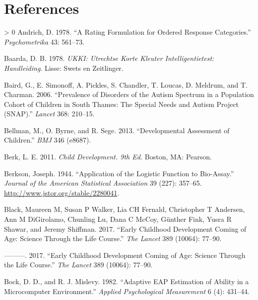 \documentclass[
]{book}
\newlength{\cslhangindent}
\newenvironment{CSLReferences}[3] %
 {%
  \setlength{\parindent}{0pt}
  \ifodd #1 \everypar{\setlength{\hangindent}{\cslhangindent}}\ignorespaces\fi
  \ifnum #2 > 0
  \setlength{\parskip}{#2\baselineskip}
  \fi
 }%
 {}
\begin{document}
\hypertarget{references}{%
\chapter*{References}\label{references}}

\hypertarget{refs}{}
\begin{CSLReferences}{1}{0}
\leavevmode\hypertarget{ref-andrich1978}{}%
Andrich, D. 1978. {``A Rating Formulation for Ordered Response Categories.''} \emph{Psychometrika} 43: 561--73.

\leavevmode\hypertarget{ref-baarda1978}{}%
Baarda, D. B. 1978. \emph{UKKI: Utrechtse Korte Kleuter Intelligentietest: Handleiding}. Lisse: Swets en Zeitlinger.

\leavevmode\hypertarget{ref-baird2006}{}%
Baird, G., E. Simonoff, A. Pickles, S. Chandler, T. Loucas, D. Meldrum, and T. Charman. 2006. {``Prevalence of Disorders of the Autism Spectrum in a Population Cohort of Children in South Thames: The Special Needs and Autism Project (SNAP).''} \emph{Lancet} 368: 210--15.

\leavevmode\hypertarget{ref-bellman2013}{}%
Bellman, M., O. Byrne, and R. Sege. 2013. {``Developmental Assessment of Children.''} \emph{BMJ} 346 (e8687).

\leavevmode\hypertarget{ref-berk2013}{}%
Berk, L. E. 2011. \emph{Child Development. 9th Ed.} Boston, MA: Pearson.

\leavevmode\hypertarget{ref-berkson1944}{}%
Berkson, Joseph. 1944. {``Application of the Logistic Function to Bio-Assay.''} \emph{Journal of the American Statistical Association} 39 (227): 357--65. \url{http://www.jstor.org/stable/2280041}.

\leavevmode\hypertarget{ref-black2017}{}%
Black, Maureen M, Susan P Walker, Lia CH Fernald, Christopher T Andersen, Ann M DiGirolamo, Chunling Lu, Dana C McCoy, Günther Fink, Yusra R Shawar, and Jeremy Shiffman. 2017. {``Early Childhood Development Coming of Age: Science Through the Life Course.''} \emph{The Lancet} 389 (10064): 77--90.

\leavevmode\hypertarget{ref-black2017}{}%
---------. 2017. {``Early Childhood Development Coming of Age: Science Through the Life Course.''} \emph{The Lancet} 389 (10064): 77--90.

\leavevmode\hypertarget{ref-bock1982}{}%
Bock, D. D., and R. J. Mislevy. 1982. {``Adaptive {EAP} Estimation of Ability in a Microcomputer Environment.''} \emph{Applied Psychological Measurement} 6 (4): 431--44.


\end{CSLReferences}
\end{document}
